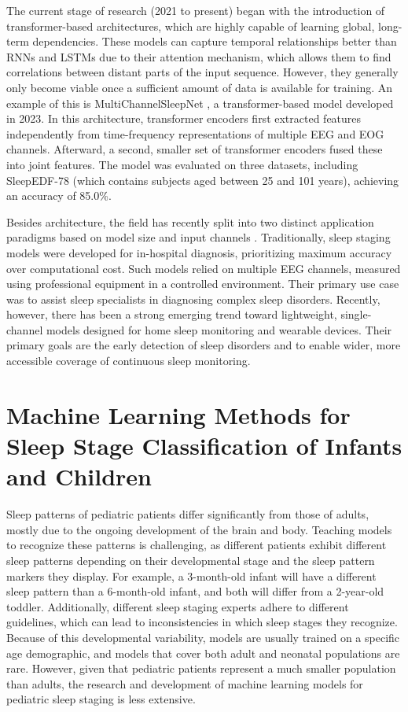 The current stage of research (2021 to present) began with the introduction of transformer-based architectures, 
which are highly capable of learning global, long-term dependencies. These models can capture temporal 
relationships better than RNNs and LSTMs due to their attention mechanism, which allows them to find 
correlations between distant parts of the input sequence. However, they generally only become viable once 
a sufficient amount of data is available for training. An example of this is MultiChannelSleepNet \cite{transformersleep2023}, 
a transformer-based model developed in 2023. In this architecture, transformer encoders first extracted 
features independently from time-frequency representations of multiple EEG and EOG channels. Afterward, 
a second, smaller set of transformer encoders fused these into joint features. The model was evaluated on 
three datasets, including SleepEDF-78 (which contains subjects aged between 25 and 101 years), achieving 
an accuracy of 85.0\%.

Besides architecture, the field has recently split into two distinct application paradigms based on model size 
and input channels \cite{Yang2026}. Traditionally, sleep staging models were developed for in-hospital 
diagnosis, prioritizing maximum accuracy over computational cost. Such models relied on multiple EEG channels, 
measured using professional equipment in a controlled environment. Their primary use case was to assist sleep 
specialists in diagnosing complex sleep disorders. Recently, however, there has been a strong emerging trend 
toward lightweight, single-channel models designed for home sleep monitoring and wearable devices. 
Their primary goals are the early detection of sleep disorders and to enable wider, more accessible coverage 
of continuous sleep monitoring.

\section{Machine Learning Methods for Sleep Stage Classification of Infants and Children}
Sleep patterns of pediatric patients differ significantly from those of adults, mostly 
due to the ongoing development of the brain and body. Teaching models to recognize these 
patterns is challenging, as different patients exhibit different sleep patterns depending
on their developmental stage and the sleep pattern markers they display. For example, a 3-month-old infant will have a different
sleep pattern than a 6-month-old infant, and both will differ from a 2-year-old toddler.
Additionally, different sleep staging experts adhere to different guidelines, which can lead to inconsistencies
in which sleep stages they recognize.
Because of this developmental variability, models are usually trained on a specific age demographic, and 
models that cover both adult and neonatal populations are rare.
However, given that pediatric patients represent a much smaller population than adults, the research 
and development of machine learning models for pediatric sleep staging is less extensive.


